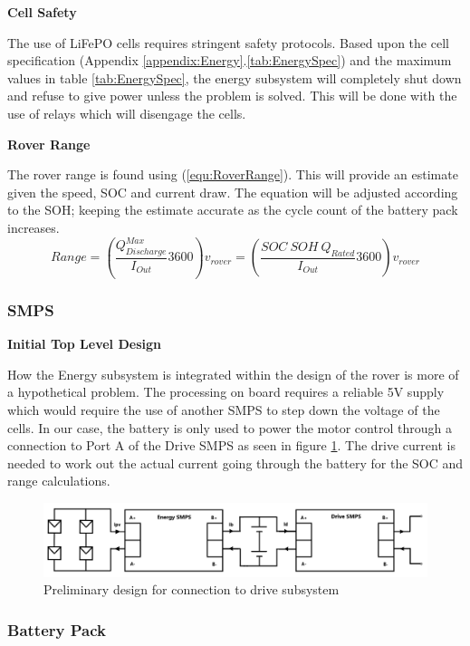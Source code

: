 \documentclass[10pt,twoside]{article}
\begin{document}
\textbf{Cell Safety}

The use of LiFePO cells requires stringent safety protocols. Based upon the cell specification (Appendix \ref{appendix:Energy}.\ref{tab:EnergySpec}) and the maximum values in table \ref{tab:EnergySpec}, the energy subsystem will completely shut down and refuse to give power unless the problem is solved. This will be done with the use of relays which will disengage the cells.

\textbf{Rover Range}

The rover range is found using (\ref{equ:RoverRange}). This will provide an estimate given the speed, SOC and current draw. The equation will be adjusted according to the SOH; keeping the estimate accurate as the cycle count of the battery pack increases.   
\begin{equation}
    Range = \left(\frac{Q_{Discharge}^{Max}}{I_{Out}}3600\right) v_{rover} = \left(\frac{SOC \ SOH \ Q_{Rated} }{I_{Out}} 3600\right) v_{rover}      
    \label{equ:RoverRange}
\end{equation}
\subsubsection{SMPS}

\textbf{Initial Top Level Design}

How the Energy subsystem is integrated within the design of the rover is more of a hypothetical problem. The processing on board requires a reliable 5V supply which would require the use of another SMPS to step down the voltage of the cells. In our case, the battery is only used to power the motor control through a connection to Port A of the Drive SMPS as seen in figure \ref{fig:InitalDesign}. The drive current is needed to work out the actual current going through the battery for the SOC and range calculations.

\begin{figure}[hbt]
\includegraphics[scale = 0.5]{SMPS}
\centering
\caption{Preliminary design for connection to drive subsystem}
\label{fig:InitalDesign}
\end{figure}

\subsubsection{Battery Pack}
\end{document}
